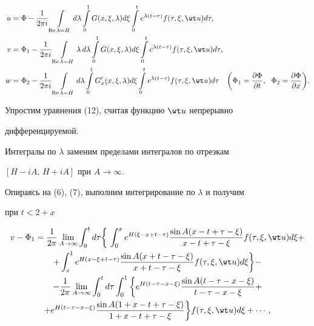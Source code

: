 \begin{align} 


u&=\Phi-\frac{1}{2\pi i}\intl_{\re\lambda=H}d\lambda 


\intl^1_0 G(x,\xi,\lambda)d\xi\intl^t_0 


e^{\lambda(t-\tau)}f(\tau,\xi,\wt u)d\tau,\notag\\ 


% 


v&=\Phi_1-\frac{1}{2\pi i}\intl_{\re\lambda=H}\lambda\,d\lambda 


\intl^1_0 G(x,\xi,\lambda)d\xi\intl^t_0 


e^{\lambda(t-\tau)}f(\tau,\xi,\wt u)d\tau,\\


% 


w&=\Phi_2-\frac{1}{2\pi i}\intl_{\re\lambda=H}d\lambda 


\intl^1_0 G'_x(x,\xi,\lambda)d\xi\intl^t_0 


e^{\lambda(t-\tau)}f(\tau,\xi,\wt u)d\tau\notag\quad 


\bigg(\Phi_1=\myfrac{\Phi}{t},\ \;\Phi_2=\myfrac{\Phi}{x}\bigg).


\end{align} 


Упростим уравнения (12), считая функцию $\wt u$ непрерывно 


дифференцируемой. 


Интегралы по $\lambda$ заменим пределами интегралов по отрезкам 


$[H-i A,\,H+i A]$ при $A\to\infty$. 


Опираясь на (6), (7), выполним интегрирование по $\lambda$ и получим 


при $t<2+x$ 


\begin{multline} 


v-\Phi_1=\frac{1}{2\pi}\lim_{A\to\infty}\int^t_0 d\tau\bigg\{\, 


\int^x_0 e^{H(\xi-x+t-\tau)} 


\frac{\sin A(x-t+\tau-\xi)}{x-t+\tau-\xi} 


f(\tau,\xi,\wt u)d\xi+ \\ 


%


+\int^1_x e^{H(x-\xi+t-\tau)} 


\frac{\sin A(x+t-\tau-\xi)}{x+t-\tau-\xi} 


f(\tau,\xi,\wt u)d\xi\bigg\}- \\


%


-\frac{1}{2\pi}\lim_{A\to\infty}\int^t_0d\tau\int^1_0\bigg\{ 


e^{H(t-\tau-x-\xi)}\frac{\sin A(t-\tau-x-\xi)}{t-\tau-x-\xi}+ \\ 


%


+e^{H(t-\tau-x-\xi)} 


\frac{\sin A(1+x-t+\tau-\xi)}{1+x-t+\tau-\xi}\bigg\} 


f(\tau,\xi,\wt u)d\xi+\dotsb,


\end{multline} 


